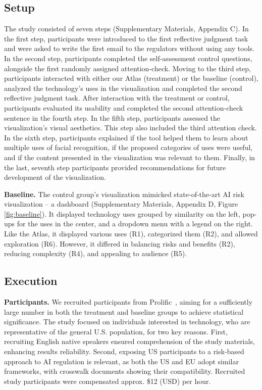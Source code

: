 \subsection{Setup}
The study consisted of seven steps (Supplementary Materials, Appendix C). In the first step, participants were introduced to the first reflective judgment task and were asked to write the first email to the regulators without using any tools. In the second step, participants completed the self-assessment control questions, alongside the first randomly assigned attention-check. Moving to the third step, participants interacted with either our Atlas (treatment) or the baseline (control), analyzed the technology's uses in the visualization and completed the second reflective judgment task. After interaction with the treatment or control, participants evaluated its usability and completed the second attention-check sentence in the fourth step. In the fifth step, participants assessed the visualization's visual aesthetics. \hspace{1cm} This step also included the third attention check. In the sixth step, participants explained if the tool helped them to learn about multiple uses of facial recognition, if the proposed categories of uses were useful, and if the content presented in the visualization was relevant to them. Finally, in the last, seventh step participants provided recommendations for future development of the visualization.
\smallskip

\noindent\textbf{Baseline.} 
The control group's visualization mimicked state-of-the-art AI risk visualization -- a dashboard (Supplementary Materials, Appendix D, Figure \ref{fig:baseline}). It displayed technology uses grouped by similarity on the left, pop-ups for the uses in the center, and a dropdown menu with a legend on the right. Like the Atlas, it displayed various uses (R1), categorized them (R2), and allowed exploration (R6). However, it differed in balancing risks and benefits (R2), reducing complexity (R4), and appealing to audience (R5). 

\subsection{Execution}
\label{subsec:execution}

\noindent\textbf{Participants.}
We recruited participants from Prolific~\cite{prolific}, aiming for a sufficiently large number in both the treatment and baseline groups to achieve statistical significance. The study focused on individuals interested in technology, who are representative of the general U.S. population, for two key reasons. First, recruiting English native speakers ensured comprehension of the study materials, enhancing results reliability. Second, exposing US participants to a risk-based approach to AI regulation is relevant, as both the US and EU adopt similar frameworks, with crosswalk documents showing their compatibility. Recruited study participants were compensated approx. \$12 (USD) per hour. 

